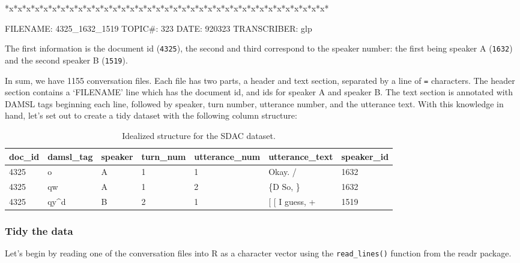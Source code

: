 \documentclass[
]{article}
\newenvironment{Shaded}{\begin{snugshade}}{\end{snugshade}}
\newcommand{\NormalTok}[1]{#1}
\begin{document}
\begin{Shaded}
\begin{Highlighting}[]
\NormalTok{*x*x*x*x*x*x*x*x*x*x*x*x*x*x*x*x*x*x*x*x*x*x*x*x*x*x*x*x*x*x*x*x*x*x*x*x*x*}


\NormalTok{FILENAME:   4325\_1632\_1519}
\NormalTok{TOPIC\#:     323}
\NormalTok{DATE:       920323}
\NormalTok{TRANSCRIBER:    glp}
\end{Highlighting}
\end{Shaded}

The first information is the document id (\texttt{4325}), the second and third correspond to the speaker number: the first being speaker A (\texttt{1632}) and the second speaker B (\texttt{1519}).

In sum, we have 1155 conversation files. Each file has two parts, a header and text section, separated by a line of \texttt{=} characters. The header section contains a `FILENAME' line which has the document id, and ids for speaker A and speaker B. The text section is annotated with DAMSL tags beginning each line, followed by speaker, turn number, utterance number, and the utterance text. With this knowledge in hand, let's set out to create a tidy dataset with the following column structure:

\begin{table}

\caption{\label{tab:cd-semi-sdac-idealized-dataset}Idealized structure for the SDAC dataset.}
\centering
\begin{tabular}[t]{lllllll}
\toprule
doc\_id & damsl\_tag & speaker & turn\_num & utterance\_num & utterance\_text & speaker\_id\\
\midrule
4325 & o & A & 1 & 1 & Okay.  / & 1632\\
4325 & qw & A & 1 & 2 & \{D So, \} & 1632\\
4325 & qy\textasciicircum{}d & B & 2 & 1 & {}[ [ I guess, + & 1519\\
\bottomrule
\end{tabular}
\end{table}

\hypertarget{tidy-the-data-1}{%
\subsubsection{Tidy the data}\label{tidy-the-data-1}}

Let's begin by reading one of the conversation files into R as a character vector using the \texttt{read\_lines()} function from the readr package.
\end{document}
